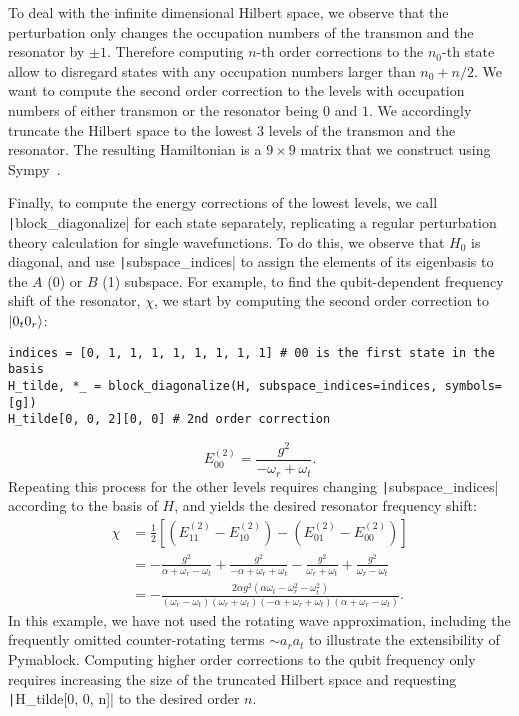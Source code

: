 To deal with the infinite dimensional Hilbert space, we observe that the perturbation only changes the occupation numbers of the transmon and the resonator by $\pm 1$.
Therefore computing $n$-th order corrections to the $n_0$-th state allow to disregard states with any occupation numbers larger than $n_0 + n/2$.
We want to compute the second order correction to the levels with occupation numbers of either transmon or the resonator being $0$ and $1$.
We accordingly truncate the Hilbert space to the lowest 3 levels of the transmon and the resonator.
The resulting Hamiltonian is a $9 \times 9$ matrix that we construct using Sympy~\cite{Meurer_2017}.

Finally, to compute the energy corrections of the lowest levels, we call \texttt|block_diagonalize| for each state separately, replicating a regular perturbation theory calculation for single wavefunctions.
To do this, we observe that $H_0$ is diagonal, and use \texttt|subspace_indices| to assign the elements of its eigenbasis to the $A$ (0) or $B$ (1) subspace.
For example, to find the qubit-dependent frequency shift of the resonator, $\chi$, we start by computing the second order correction to $\ket{0_{t}0_{r}}$:
%
\begin{verbatim}
indices = [0, 1, 1, 1, 1, 1, 1, 1, 1] # 00 is the first state in the basis
H_tilde, *_ = block_diagonalize(H, subspace_indices=indices, symbols=[g])
H_tilde[0, 0, 2][0, 0] # 2nd order correction
\end{verbatim}
%
\begin{equation}
    E^{(2)}_{00} = \frac{g^{2}}{-\omega_{r} + \omega_{t}}.
\end{equation}
%
Repeating this process for the other levels requires changing \texttt|subspace_indices| according to the basis of $H$, and yields the desired resonator frequency shift:
%
\begin{equation}
\begin{aligned}
\chi &= \frac{1}{2}\left[(E^{(2)}_{11} - E^{(2)}_{10}) - (E^{(2)}_{01} - E^{(2)}_{00})\right] \\
& = - \frac{g^{2}}{\alpha + \omega_{r} - \omega_{t}} + \frac{g^{2}}{- \alpha + \omega_{r} + \omega_{t}} - \frac{g^{2}}{\omega_{r} + \omega_{t}} + \frac{g^{2}}{\omega_{r} - \omega_{t}} \\
& = - \frac{2 \alpha g^{2} \left(\alpha \omega_{t} - \omega_{r}^{2} - \omega_{t}^{2}\right)}{\left(\omega_{r} - \omega_{t}\right) \left(\omega_{r} + \omega_{t}\right) \left(- \alpha + \omega_{r} + \omega_{t}\right) \left(\alpha + \omega_{r} - \omega_{t}\right)}.
\end{aligned}
\end{equation}
%
In this example, we have not used the rotating wave approximation, including the frequently omitted counter-rotating terms $\sim a_{r} a_{t}$ to illustrate the extensibility of Pymablock.
Computing higher order corrections to the qubit frequency only requires increasing the size of the truncated Hilbert space and requesting \texttt|H_tilde[0, 0, n]| to the desired order $n$.

